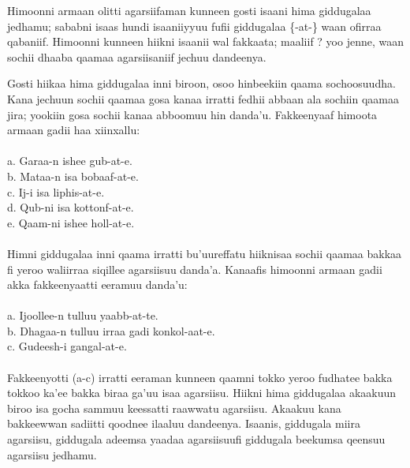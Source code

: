\documentclass[11pt,b5paper]{book}
\begin{document}
Himoonni armaan olitti agarsiifaman kunneen gosti isaani hima giddugalaa jedhamu; sababni isaas hundi isaaniiyyuu fufii giddugalaa \{-at-\} waan ofirraa qabaniif. Himoonni kunneen hiikni isaanii wal fakkaata; maaliif ? yoo jenne, waan sochii dhaaba qaamaa agarsiisaniif jechuu dandeenya.

Gosti hiikaa hima giddugalaa inni biroon, osoo hinbeekiin qaama sochoosuudha. Kana jechuun sochii qaamaa gosa kanaa irratti fedhii abbaan ala sochiin qaamaa jira; yookiin gosa sochii kanaa abboomuu hin danda’u. Fakkeenyaaf himoota armaan gadii haa xiinxallu:\\
\\
a. Garaa-n ishee gub-at-e.\\
b. Mataa-n isa bobaaf-at-e.\\
c. Ij-i isa liphis-at-e.\\
d. Qub-ni isa kottonf-at-e.\\
e. Qaam-ni ishee holl-at-e. \\
\\
Himni giddugalaa inni qaama irratti bu’uureffatu hiiknisaa sochii qaamaa bakkaa fi yeroo waliirraa siqillee agarsiisuu danda’a. Kanaafis himoonni armaan gadii akka fakkeenyaatti eeramuu danda’u: \\
\\
a. Ijoollee-n tulluu yaabb-at-te.\\
b. Dhagaa-n tulluu irraa gadi konkol-aat-e.\\
c. Gudeesh-i gangal-at-e.\\
\\

Fakkeenyotti (a-c) irratti eeraman kunneen qaamni tokko yeroo fudhatee bakka tokkoo ka’ee bakka biraa ga’uu isaa agarsiisu. Hiikni hima giddugalaa akaakuun biroo isa gocha sammuu keessatti raawwatu agarsiisu. Akaakuu kana bakkeewwan sadiitti qoodnee ilaaluu dandeenya. Isaanis, giddugala miira agarsiisu, giddugala adeemsa yaadaa agarsiisuufi giddugala beekumsa qeensuu agarsiisu jedhamu.
\end{document}
